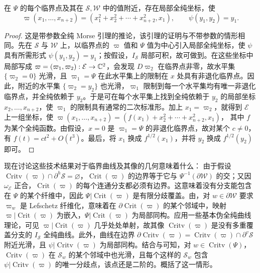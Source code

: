\begin{lemma}\label{st:15.9}
在 $\Psi$ 的每个临界点及其在 $\mathcal S,\mathcal W$ 中的值附近，存在局部全纯坐标，使
\[
\varpi(x_1,\ldots,x_{n+2})=(x_1^2+x_2^2+\cdots+x_{n+2}^2,x_1),\qquad
\psi(y_1,y_2)=y_1.
\]
\end{lemma}
\begin{proof}
这是带参数全纯 Morse 引理的推论，该引理的证明与不带参数的情形相同。先在 $\mathcal S$ 与 $\mathcal W$ 上，以临界点的 $\varpi$ 值和 $\Psi$ 值为中心引入局部全纯坐标，使 $\psi$ 具有所需形式 $\psi(y_1,y_2)=y_1$；按假设，$I_{\mathcal S}$ 局部可积，故可做到。在这些坐标中局部写成 $\varpi=(\varpi_1,\varpi_2):\mathcal E\to\mathbb C^2$，会发现 $D\varpi_2$ 在临界点非零，故水平集 $\{\varpi_2=0\}$ 光滑，且 $\varpi_1=\Psi$ 在此水平集上的限制在 $x$ 处具有非退化临界点。因此，附近的水平集 $\{\varpi_2=y_2\}$ 也光滑，$\varpi_1$ 限制到每一个水平集均有唯一非退化临界点，并全纯依赖于 $y_2$。于是可在每个水平集上找到全纯依赖于 $y_2$ 的局部坐标 $x_2,\ldots,x_{n+2}$，使 $\varpi_1$ 的限制具有通常的二次标准形。加上 $x_1=\varpi_2$，就得到 $\mathcal E$ 上一组坐标，使 $\varpi(x_1,\ldots,x_{n+2})=(f(x_1)+x_2^2+\cdots+x_{n+2}^2,x_1)$，
其中 $f$ 为某个全纯函数。由假设，$x=0$ 是 $\varpi_1=\Psi$ 的非退化临界点，故对某个 $c\ne0$，有 $f(t)=ct^2+O(t^3)$。最后，将 $x_1$ 换成 $f^{1/2}(x_1)$，并将 $y_2$ 换成 $f^{1/2}(y_2)$ 即可。
\end{proof}

现在讨论这些技术结果对于临界曲线及其像的几何意味着什么：
由于假设 $\operatorname{Critv}(\varpi)\cap\partial^h\mathcal S=\varnothing$，$\operatorname{Crit}(\varpi)$ 的边界等于它与 $\Psi^{-1}(\partial\mathcal W)$ 的交；又因 $\omega_{\mathcal E}$ 正合，$\operatorname{Crit}(\varpi)$ 的每个连通分支都必须有边界。这意味着没有分支能包含在 $\Psi$ 的某个纤维中，因此 $\Psi|\operatorname{Crit}(\varpi)$ 是有限分歧覆盖。由，对 $w\in\partial\mathcal W$ 要求 $\varpi_w$ 是 Lefschetz 纤维化，意味着在 $\partial\operatorname{Crit}(\varpi)$ 的某个邻域中，映射 $\varpi|\operatorname{Crit}(\varpi)$ 为嵌入，$\Psi|\operatorname{Crit}(\varpi)$ 为局部同构。应用一些基本伪全纯曲线理论，可见 $\varpi|\operatorname{Crit}(\varpi)$ 几乎处处单射，故其像 $\operatorname{Critv}(\varpi)$ 是没有多重覆盖分支的 $I_{\mathcal S}$ 全纯曲线。此外，曲线在边界 $\partial\operatorname{Critv}(\varpi)=\operatorname{Critv}(\varpi)\cap\partial^v\mathcal S$ 附近光滑，且 $\psi|\operatorname{Critv}(\varpi)$ 为局部同构。结合与可知，对 $w\in\operatorname{Critv}(\Psi)$，$\operatorname{Critv}(\varpi)$ 在 $\mathcal S_w$ 的某个邻域中也光滑，且每个这样的 $\mathcal S_w$ 包含 $\psi|\operatorname{Critv}(\varpi)$ 的唯一分歧点，该点还是二阶的。概括了这一情形。

